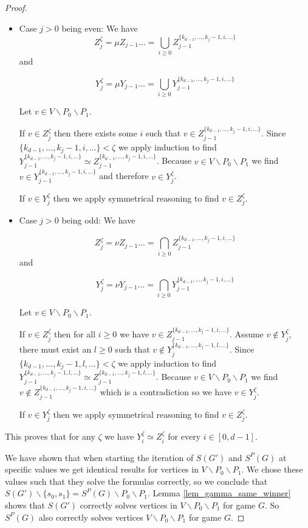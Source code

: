 \begin{theorem}
\begin{proof}
\begin{itemize}
			\item Case $j > 0$ being even: We have 
			\[ Z_j^{\zeta} = \mu Z_{j-1}\dots = \bigcup_{i\geq 0} Z_{j-1}^{\{k_{d-1},\dots,k_j-1,i,\dots\}}\]
			and 
			
			\[ Y_j^{\zeta} = \mu Y_{j-1}\dots = \bigcup_{i\geq 0} Y_{j-1}^{\{k_{d-1},\dots,k_j-1,i,\dots\}}\]
			
			Let $v \in V \backslash P_0 \backslash P_1$.
			
			If $v \in Z_j^{\zeta}$ then there exists some $i$ such that $v \in Z_{j-1}^{\{k_{d-1},\dots,k_j-1,i,\dots\}}$. Since $\{k_{d-1},\dots,k_j-1,i,\dots\} < \zeta$ we apply induction to find $Y_{j-1}^{\{k_{d-1},\dots,k_j-1,i,\dots\}} \simeq Z_{j-1}^{\{k_{d-1},\dots,k_j-1,i,\dots\}}$. Because $v \in V \backslash P_0 \backslash P_1$ we find $v \in Y_{j-1}^{\{k_{d-1},\dots,k_j-1,i,\dots\}}$ and therefore $v \in Y_j^{\zeta}$.
			
			If $v \in Y_j^{\zeta}$ then we apply symmetrical reasoning to find $v \in Z_j^{\zeta}$.
			\item Case $j > 0$ being odd: We have 
			
			\[ Z_j^{\zeta} = \nu Z_{j-1}\dots = \bigcap_{i\geq 0} Z_{j-1}^{\{k_{d-1},\dots,k_j-1,i,\dots\}}\]
			and 
			
			\[ Y_j^{\zeta} = \nu Y_{j-1}\dots = \bigcap_{i\geq 0} Y_{j-1}^{\{k_{d-1},\dots,k_j-1,i,\dots\}}\]
			
			Let $v \in V \backslash P_0 \backslash P_1$.
			
			If $v \in Z_j^{\zeta}$ then for all $i \geq 0$ we have $v \in Z_{j-1}^{\{k_{d-1},\dots,k_j-1,i,\dots\}}$. Assume $v \notin Y_j^{\zeta}$, there must exist an $l \geq 0$ such that $v \notin Y_j^{\{k_{d-1},\dots,k_j-1,l,\dots\}}$. Since $\{k_{d-1},\dots,k_j-1,l,\dots\} < \zeta$ we apply induction to find $Y_{j-1}^{\{k_{d-1},\dots,k_j-1,l,\dots\}} \simeq Z_{j-1}^{\{k_{d-1},\dots,k_j-1,l,\dots\}}$. Because $v \in V \backslash P_0 \backslash P_1$ we find $v \notin Z_{j-1}^{\{k_{d-1},\dots,k_j-1,i,\dots\}}$ which is a contradiction so we have $v \in Y_j^{\zeta}$.
			
			If $v \in Y_j^{\zeta}$ then we apply symmetrical reasoning to find $v \in Z_j^{\zeta}$.
		\end{itemize}
		
		This proves that for any $\zeta$ we have $Y_i^{\zeta} \simeq Z_i^{\zeta}$ for every $i \in [0,d-1]$.
		
		We have shown that when starting the iteration of $S(G')$ and $S^P(G)$ at specific values we get identical results for vertices in $V \backslash P_0 \backslash P_1$. We chose these values such that they solve the formulas correctly, so we conclude that $S(G') \backslash \{s_0,s_1\} = S^P(G) \backslash P_0 \backslash P_1$. Lemma \ref{lem_gamma_same_winner} shows that $S(G')$ correctly solves vertices in $V \backslash P_0 \backslash P_1$ for game $G$. So $S^P(G)$ also correctly solves vertices $V \backslash P_0 \backslash P_1$ for game $G$. 
		

\end{proof}
\end{theorem}
